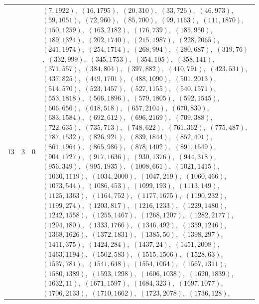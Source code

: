 \documentclass[11pt]{article}
\begin{document}
\begin{longtable}{@{}rrl>{\raggedright\arraybackslash}p{}@{}}
13 & 3 & $0$ & $(7,1922)$,\allowbreak\ $(16,1795)$,\allowbreak\ $(20,310)$,\allowbreak\ $(33,726)$,\allowbreak\ $(46,973)$,\allowbreak\ $(59,1051)$,\allowbreak\ $(72,960)$,\allowbreak\ $(85,700)$,\allowbreak\ $(99,1163)$,\allowbreak\ $(111,1870)$,\allowbreak\ $(150,1259)$,\allowbreak\ $(163,2182)$,\allowbreak\ $(176,739)$,\allowbreak\ $(185,950)$,\allowbreak\ $(189,1324)$,\allowbreak\ $(202,1740)$,\allowbreak\ $(215,1987)$,\allowbreak\ $(228,2065)$,\allowbreak\ $(241,1974)$,\allowbreak\ $(254,1714)$,\allowbreak\ $(268,994)$,\allowbreak\ $(280,687)$,\allowbreak\ $(319,76)$,\allowbreak\ $(332,999)$,\allowbreak\ $(345,1753)$,\allowbreak\ $(354,105)$,\allowbreak\ $(358,141)$,\allowbreak\ $(371,557)$,\allowbreak\ $(384,804)$,\allowbreak\ $(397,882)$,\allowbreak\ $(410,791)$,\allowbreak\ $(423,531)$,\allowbreak\ $(437,825)$,\allowbreak\ $(449,1701)$,\allowbreak\ $(488,1090)$,\allowbreak\ $(501,2013)$,\allowbreak\ $(514,570)$,\allowbreak\ $(523,1457)$,\allowbreak\ $(527,1155)$,\allowbreak\ $(540,1571)$,\allowbreak\ $(553,1818)$,\allowbreak\ $(566,1896)$,\allowbreak\ $(579,1805)$,\allowbreak\ $(592,1545)$,\allowbreak\ $(606,656)$,\allowbreak\ $(618,518)$,\allowbreak\ $(657,2104)$,\allowbreak\ $(670,830)$,\allowbreak\ $(683,1584)$,\allowbreak\ $(692,612)$,\allowbreak\ $(696,2169)$,\allowbreak\ $(709,388)$,\allowbreak\ $(722,635)$,\allowbreak\ $(735,713)$,\allowbreak\ $(748,622)$,\allowbreak\ $(761,362)$,\allowbreak\ $(775,487)$,\allowbreak\ $(787,1532)$,\allowbreak\ $(826,921)$,\allowbreak\ $(839,1844)$,\allowbreak\ $(852,401)$,\allowbreak\ $(861,1964)$,\allowbreak\ $(865,986)$,\allowbreak\ $(878,1402)$,\allowbreak\ $(891,1649)$,\allowbreak\ $(904,1727)$,\allowbreak\ $(917,1636)$,\allowbreak\ $(930,1376)$,\allowbreak\ $(944,318)$,\allowbreak\ $(956,349)$,\allowbreak\ $(995,1935)$,\allowbreak\ $(1008,661)$,\allowbreak\ $(1021,1415)$,\allowbreak\ $(1030,1119)$,\allowbreak\ $(1034,2000)$,\allowbreak\ $(1047,219)$,\allowbreak\ $(1060,466)$,\allowbreak\ $(1073,544)$,\allowbreak\ $(1086,453)$,\allowbreak\ $(1099,193)$,\allowbreak\ $(1113,149)$,\allowbreak\ $(1125,1363)$,\allowbreak\ $(1164,752)$,\allowbreak\ $(1177,1675)$,\allowbreak\ $(1190,232)$,\allowbreak\ $(1199,274)$,\allowbreak\ $(1203,817)$,\allowbreak\ $(1216,1233)$,\allowbreak\ $(1229,1480)$,\allowbreak\ $(1242,1558)$,\allowbreak\ $(1255,1467)$,\allowbreak\ $(1268,1207)$,\allowbreak\ $(1282,2177)$,\allowbreak\ $(1294,180)$,\allowbreak\ $(1333,1766)$,\allowbreak\ $(1346,492)$,\allowbreak\ $(1359,1246)$,\allowbreak\ $(1368,1626)$,\allowbreak\ $(1372,1831)$,\allowbreak\ $(1385,50)$,\allowbreak\ $(1398,297)$,\allowbreak\ $(1411,375)$,\allowbreak\ $(1424,284)$,\allowbreak\ $(1437,24)$,\allowbreak\ $(1451,2008)$,\allowbreak\ $(1463,1194)$,\allowbreak\ $(1502,583)$,\allowbreak\ $(1515,1506)$,\allowbreak\ $(1528,63)$,\allowbreak\ $(1537,781)$,\allowbreak\ $(1541,648)$,\allowbreak\ $(1554,1064)$,\allowbreak\ $(1567,1311)$,\allowbreak\ $(1580,1389)$,\allowbreak\ $(1593,1298)$,\allowbreak\ $(1606,1038)$,\allowbreak\ $(1620,1839)$,\allowbreak\ $(1632,11)$,\allowbreak\ $(1671,1597)$,\allowbreak\ $(1684,323)$,\allowbreak\ $(1697,1077)$,\allowbreak\ $(1706,2133)$,\allowbreak\ $(1710,1662)$,\allowbreak\ $(1723,2078)$,\allowbreak\ $(1736,128)$,\allowbreak\ 
\end{longtable}
\end{document}
